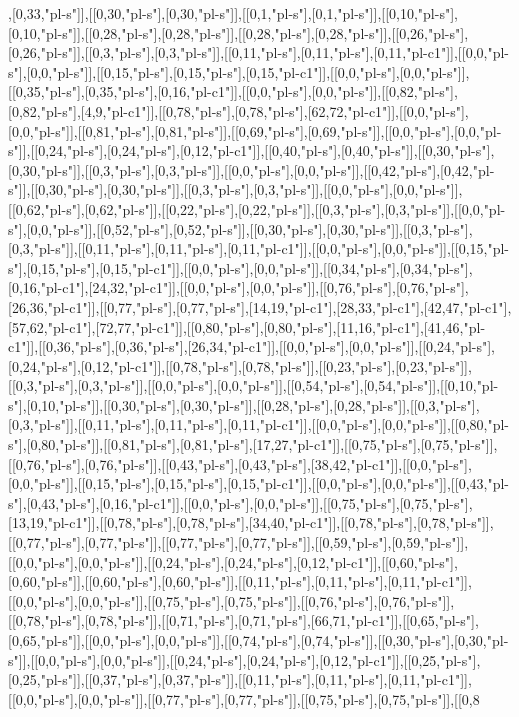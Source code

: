,[0,33,"pl-s"]],[[0,30,"pl-s"],[0,30,"pl-s"]],[[0,1,"pl-s"],[0,1,"pl-s"]],[[0,10,"pl-s"],[0,10,"pl-s"]],[[0,28,"pl-s"],[0,28,"pl-s"]],[[0,28,"pl-s"],[0,28,"pl-s"]],[[0,26,"pl-s"],[0,26,"pl-s"]],[[0,3,"pl-s"],[0,3,"pl-s"]],[[0,11,"pl-s"],[0,11,"pl-s"],[0,11,"pl-c1"]],[[0,0,"pl-s"],[0,0,"pl-s"]],[[0,15,"pl-s"],[0,15,"pl-s"],[0,15,"pl-c1"]],[[0,0,"pl-s"],[0,0,"pl-s"]],[[0,35,"pl-s"],[0,35,"pl-s"],[0,16,"pl-c1"]],[[0,0,"pl-s"],[0,0,"pl-s"]],[[0,82,"pl-s"],[0,82,"pl-s"],[4,9,"pl-c1"]],[[0,78,"pl-s"],[0,78,"pl-s"],[62,72,"pl-c1"]],[[0,0,"pl-s"],[0,0,"pl-s"]],[[0,81,"pl-s"],[0,81,"pl-s"]],[[0,69,"pl-s"],[0,69,"pl-s"]],[[0,0,"pl-s"],[0,0,"pl-s"]],[[0,24,"pl-s"],[0,24,"pl-s"],[0,12,"pl-c1"]],[[0,40,"pl-s"],[0,40,"pl-s"]],[[0,30,"pl-s"],[0,30,"pl-s"]],[[0,3,"pl-s"],[0,3,"pl-s"]],[[0,0,"pl-s"],[0,0,"pl-s"]],[[0,42,"pl-s"],[0,42,"pl-s"]],[[0,30,"pl-s"],[0,30,"pl-s"]],[[0,3,"pl-s"],[0,3,"pl-s"]],[[0,0,"pl-s"],[0,0,"pl-s"]],[[0,62,"pl-s"],[0,62,"pl-s"]],[[0,22,"pl-s"],[0,22,"pl-s"]],[[0,3,"pl-s"],[0,3,"pl-s"]],[[0,0,"pl-s"],[0,0,"pl-s"]],[[0,52,"pl-s"],[0,52,"pl-s"]],[[0,30,"pl-s"],[0,30,"pl-s"]],[[0,3,"pl-s"],[0,3,"pl-s"]],[[0,11,"pl-s"],[0,11,"pl-s"],[0,11,"pl-c1"]],[[0,0,"pl-s"],[0,0,"pl-s"]],[[0,15,"pl-s"],[0,15,"pl-s"],[0,15,"pl-c1"]],[[0,0,"pl-s"],[0,0,"pl-s"]],[[0,34,"pl-s"],[0,34,"pl-s"],[0,16,"pl-c1"],[24,32,"pl-c1"]],[[0,0,"pl-s"],[0,0,"pl-s"]],[[0,76,"pl-s"],[0,76,"pl-s"],[26,36,"pl-c1"]],[[0,77,"pl-s"],[0,77,"pl-s"],[14,19,"pl-c1"],[28,33,"pl-c1"],[42,47,"pl-c1"],[57,62,"pl-c1"],[72,77,"pl-c1"]],[[0,80,"pl-s"],[0,80,"pl-s"],[11,16,"pl-c1"],[41,46,"pl-c1"]],[[0,36,"pl-s"],[0,36,"pl-s"],[26,34,"pl-c1"]],[[0,0,"pl-s"],[0,0,"pl-s"]],[[0,24,"pl-s"],[0,24,"pl-s"],[0,12,"pl-c1"]],[[0,78,"pl-s"],[0,78,"pl-s"]],[[0,23,"pl-s"],[0,23,"pl-s"]],[[0,3,"pl-s"],[0,3,"pl-s"]],[[0,0,"pl-s"],[0,0,"pl-s"]],[[0,54,"pl-s"],[0,54,"pl-s"]],[[0,10,"pl-s"],[0,10,"pl-s"]],[[0,30,"pl-s"],[0,30,"pl-s"]],[[0,28,"pl-s"],[0,28,"pl-s"]],[[0,3,"pl-s"],[0,3,"pl-s"]],[[0,11,"pl-s"],[0,11,"pl-s"],[0,11,"pl-c1"]],[[0,0,"pl-s"],[0,0,"pl-s"]],[[0,80,"pl-s"],[0,80,"pl-s"]],[[0,81,"pl-s"],[0,81,"pl-s"],[17,27,"pl-c1"]],[[0,75,"pl-s"],[0,75,"pl-s"]],[[0,76,"pl-s"],[0,76,"pl-s"]],[[0,43,"pl-s"],[0,43,"pl-s"],[38,42,"pl-c1"]],[[0,0,"pl-s"],[0,0,"pl-s"]],[[0,15,"pl-s"],[0,15,"pl-s"],[0,15,"pl-c1"]],[[0,0,"pl-s"],[0,0,"pl-s"]],[[0,43,"pl-s"],[0,43,"pl-s"],[0,16,"pl-c1"]],[[0,0,"pl-s"],[0,0,"pl-s"]],[[0,75,"pl-s"],[0,75,"pl-s"],[13,19,"pl-c1"]],[[0,78,"pl-s"],[0,78,"pl-s"],[34,40,"pl-c1"]],[[0,78,"pl-s"],[0,78,"pl-s"]],[[0,77,"pl-s"],[0,77,"pl-s"]],[[0,77,"pl-s"],[0,77,"pl-s"]],[[0,59,"pl-s"],[0,59,"pl-s"]],[[0,0,"pl-s"],[0,0,"pl-s"]],[[0,24,"pl-s"],[0,24,"pl-s"],[0,12,"pl-c1"]],[[0,60,"pl-s"],[0,60,"pl-s"]],[[0,60,"pl-s"],[0,60,"pl-s"]],[[0,11,"pl-s"],[0,11,"pl-s"],[0,11,"pl-c1"]],[[0,0,"pl-s"],[0,0,"pl-s"]],[[0,75,"pl-s"],[0,75,"pl-s"]],[[0,76,"pl-s"],[0,76,"pl-s"]],[[0,78,"pl-s"],[0,78,"pl-s"]],[[0,71,"pl-s"],[0,71,"pl-s"],[66,71,"pl-c1"]],[[0,65,"pl-s"],[0,65,"pl-s"]],[[0,0,"pl-s"],[0,0,"pl-s"]],[[0,74,"pl-s"],[0,74,"pl-s"]],[[0,30,"pl-s"],[0,30,"pl-s"]],[[0,0,"pl-s"],[0,0,"pl-s"]],[[0,24,"pl-s"],[0,24,"pl-s"],[0,12,"pl-c1"]],[[0,25,"pl-s"],[0,25,"pl-s"]],[[0,37,"pl-s"],[0,37,"pl-s"]],[[0,11,"pl-s"],[0,11,"pl-s"],[0,11,"pl-c1"]],[[0,0,"pl-s"],[0,0,"pl-s"]],[[0,77,"pl-s"],[0,77,"pl-s"]],[[0,75,"pl-s"],[0,75,"pl-s"]],[[0,8